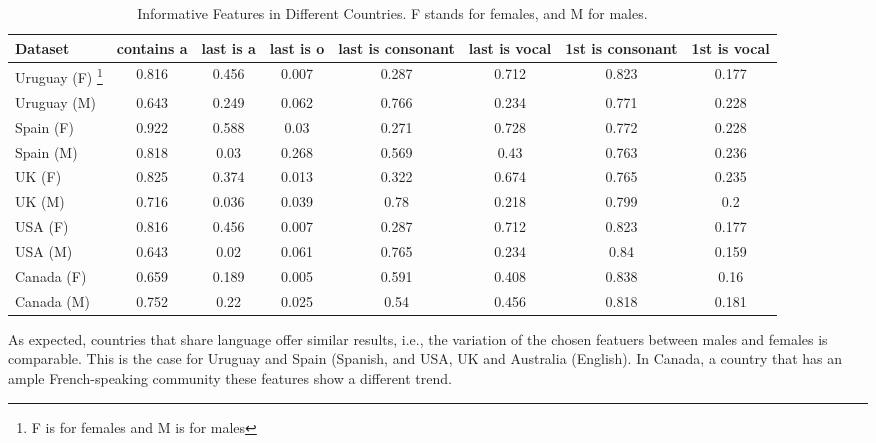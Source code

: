\documentclass[a4paper]{article}
\begin{document}
\begin{table*}
\footnotesize
\center
\begin{tabular}[]{lccccccc}
  \hline
Dataset & contains a & last is a & last is o & last is consonant & last is vocal & 1st is consonant & 1st is vocal  \tabularnewline
  \hline
 Uruguay (F) \footnote{F is for females and M is for males} &    0.816 &         0.456 &         0.007 &                 0.287 &             0.712 &                  0.823 &              0.177  \tabularnewline
 Uruguay (M) \footnotemark[3] &    0.643 &         0.249 &         0.062 &                 0.766 &             0.234 &                  0.771 &              0.228  \tabularnewline
 Spain (F) \footnotemark[3]  &    0.922 &         0.588 &          0.03 &                 0.271 &             0.728 &                  0.772 &              0.228  \tabularnewline
 Spain (M) \footnotemark[3]  &    0.818 &          0.03 &         0.268 &                 0.569 &              0.43 &                  0.763 &              0.236  \tabularnewline
 UK (F) \footnotemark[3]     &    0.825 &         0.374 &         0.013 &                 0.322 &             0.674 &                  0.765 &              0.235  \tabularnewline
 UK (M) \footnotemark[3]     &    0.716 &         0.036 &         0.039 &                  0.78 &             0.218 &                  0.799 &                0.2  \tabularnewline
 USA (F) \footnotemark[3]    &    0.816 &         0.456 &         0.007 &                 0.287 &             0.712 &                  0.823 &              0.177  \tabularnewline
 USA (M) \footnotemark[3]    &    0.643 &          0.02 &         0.061 &                 0.765 &             0.234 &                   0.84 &              0.159  \tabularnewline
 Canada (F) \footnotemark[3] &    0.659 &         0.189 &         0.005 &                 0.591 &             0.408 &                  0.838 &              0.16  \tabularnewline
 Canada (M) \footnotemark[3] &    0.752 &          0.22 &         0.025 &                  0.54 &             0.456 &                  0.818 &              0.181  \tabularnewline
\hline
\end{tabular}
\caption{Informative Features in Different Countries. F stands for females, and M for males.}
\vspace{0.3cm}
\label{table:InfoFeatures}
\end{table*}

As expected, countries that share language offer similar results, i.e., the variation of the chosen featuers between males and females is comparable.
This is the case for Uruguay and Spain (Spanish, and USA, UK and Australia (English).
In Canada, a country that has an ample French-speaking community these features show a different trend.
\end{document}
